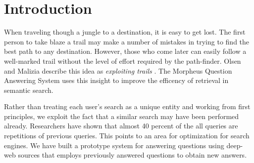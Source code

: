 \section{Introduction}
When traveling though a jungle to a destination, it is easy to get
lost.  The first person to take blaze a trail may make a number of
mistakes in trying to find the best path to any destination.  However,
those who come later can easily follow a well-marked trail without the
level of effort required by the path-finder. Olsen and Malizia
describe this idea as \emph{exploiting trails} \cite{5379671}.  The
Morpheus Question Answering System uses this insight to improve the
efficency of retrieval in semantic search.

Rather than treating each user's search as a unique entity and working
from first principles, we exploit the fact that a similar search may
have been performed already.
Researchers have shown that almost 40 percent of the all
queries are repetitions of previous queries.\cite{1277770}
This points to an  area for optimization for search engines.
We have built a prototype system for answering questions using deep-web sources
that employs previously answered questions to obtain new answers.

